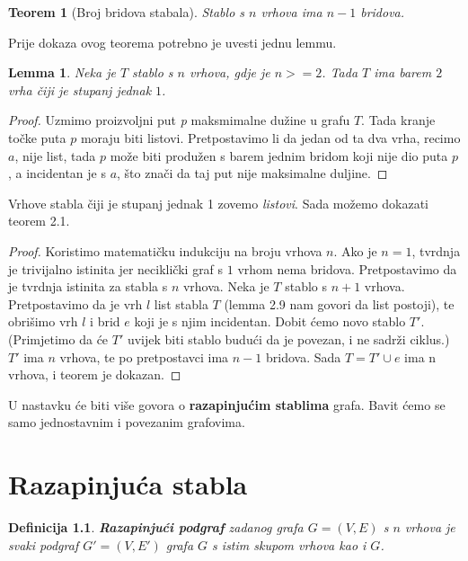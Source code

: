 \documentclass[times, utf8, zavrsni]{fer}
\newtheorem{theorem}{Teorem}[chapter]
\newtheorem{definition}{Definicija}[chapter]
\newtheorem{lemma}{Lemma}[chapter]
\begin{document}
\begin{theorem}[Broj bridova stabala]
	Stablo s $n$ vrhova ima $n-1$ bridova.
\end{theorem}

Prije dokaza ovog teorema potrebno je uvesti jednu lemmu.

\begin{lemma}
	Neka je $T$ stablo s $n$ vrhova, gdje je $n >= 2$. Tada $T$ ima barem $2$ vrha čiji je stupanj jednak $1$.
\end{lemma}

\begin{proof}
	Uzmimo proizvoljni put \textit{p} maksmimalne dužine u grafu $T$. Tada kranje točke puta $p$ moraju biti listovi. Pretpostavimo li da jedan od ta dva vrha, recimo $a$, nije list, tada $p$ može biti produžen s barem jednim bridom koji nije dio puta $p$, a incidentan je s $a$, što znači da taj put nije maksimalne duljine.
\end{proof}

Vrhove stabla čiji je stupanj jednak 1 zovemo \textit{listovi}. Sada možemo dokazati teorem 2.1.

\begin{proof}
	Koristimo matematičku indukciju na broju vrhova $n$. Ako je $n = 1$, tvrdnja je trivijalno istinita jer neciklički graf s $1$ vrhom nema bridova. Pretpostavimo da je tvrdnja istinita za stabla s $n$ vrhova. Neka je $T$ stablo s $n + 1$ vrhova. Pretpostavimo da je vrh $l$ list stabla $T$ (lemma 2.9 nam govori da list postoji), te obrišimo vrh $l$ i brid $e$ koji je s njim incidentan. Dobit ćemo novo stablo $T'$. (Primjetimo da će $T'$ uvijek biti stablo budući da je povezan, i ne sadrži ciklus.) $T'$ ima $n$ vrhova, te po pretpostavci ima $n-1$ bridova. Sada $T = T' \cup e$ ima n vrhova, i teorem je dokazan.
\end{proof} 

U nastavku će biti više govora o \textbf{razapinjućim stablima} grafa. Bavit ćemo se samo jednostavnim i povezanim grafovima.

\chapter{Razapinjuća stabla}

\begin{definition}
	\textbf{Razapinjući podgraf} zadanog grafa $G = (V, E)$ s $n$ vrhova je svaki podgraf $G' = (V, E')$ grafa $G$ s istim skupom vrhova kao i $G$.
\end{definition}
\end{document}
